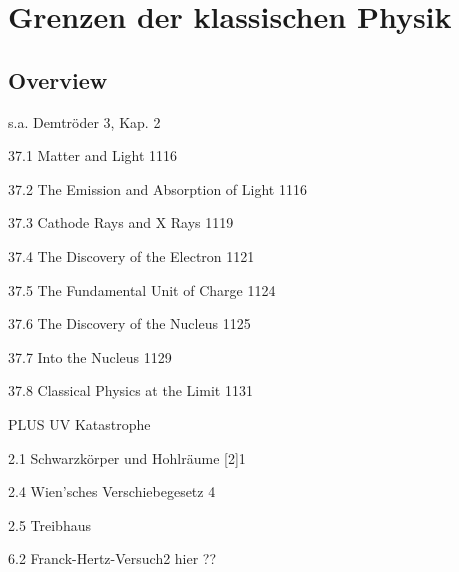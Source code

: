 \renewcommand{\lastmod}{10. September 2024}
\renewcommand{\chapterauthors}{Markus Lippitz}

\chapter{Grenzen der klassischen Physik}






\section{Overview}

s.a. Demtröder 3, Kap. 2


37.1 Matter and Light 1116

37.2 The Emission and Absorption of Light 1116

37.3 Cathode Rays and X Rays 1119

37.4 The Discovery of the Electron 1121

37.5 The Fundamental Unit of Charge 1124

37.6 The Discovery of the Nucleus 1125

37.7 Into the Nucleus 1129

37.8 Classical Physics at the Limit 1131


PLUS UV Katastrophe

2.1 Schwarzkörper und Hohlräume [2]1	



2.4 Wien’sches Verschiebegesetz 4	

2.5 Treibhaus

6.2 Franck-Hertz-Versuch2	hier ??





\printbibliography[segment=\therefsegment,heading=subbibliography]
